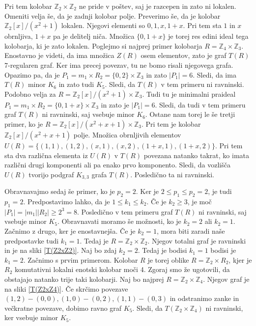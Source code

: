 \documentclass[a4paper, 12pt]{amsart}
\theoremstyle{definition} %
\theoremstyle{plain} %
\newcommand{\Z}{\mathbb Z}
\begin{document}
\begin{enumerate}
Pri tem kolobar $\Z_2 \times \Z_2$ ne pride v poštev, saj je razcepen in zato ni lokalen. Omeniti velja še, da je zadnji kolobar polje. Preverimo še, da je kolobar $\Z_2[x]/(x^2 + 1)$ lokalen. Njegovi elementi so $0,1,x,1+x$. Pri tem sta $1$ in $x$ obrnljiva, $1+x$ pa je delitelj niča. Množica $\{0,1+x\}$ je torej res edini ideal tega kolobarja, ki je zato lokalen. Poglejmo si najprej primer kolobarja $R=\Z_4 \times \Z_3$. Enostavno je videti, da ima množica $Z(R)$  osem elementov, zato je graf $T(R)$ 7-regularen graf. Ker ima precej povezav, tu ne bomo risali njegovega grafa. Opazimo pa, da je $P_1 = m_1 \times R_2 = 	\{0,2\} \times \Z_3$ in zato $|P_1| = 6$. Sledi, da ima $T(R)$ minor $K_6$ in zato tudi $K_5$. Sledi, da $T(R)$ v tem primeru ni ravninski. Podobno velja za $R = \Z_2[x]/(x^2 +1) \times \Z_3$. Tudi tu je minimalni praideal $P_1 = m_1 \times R_2 = \{0,1+x\} \times \Z_3$ in zato je $|P_1| = 6$. Sledi, da tudi v tem primeru graf $T(R)$ ni ravninski, saj vsebuje minor $K_6$. Ostane nam torej le še tretji primer, ko je $R = \Z_2[x]/(x^2 + x + 1) \times \Z_3$. Pri tem je kolobar $\Z_2[x]/(x^2 + x+1)$ polje. Množica obrnljivih elementov $U(R) = \{(1,1),(1,2),(x,1),(x,2),(1+x,1),(1+x,2)\}$. Pri tem sta dva različna elementa iz $U(R)$ v $T(R)$ povezana natanko takrat, ko imata različni drugi komponenti ali pa enako prvo komponento. Sledi, da vozlišča $U(R)$ tvorijo podgraf $K_{3,3}$ grafa $T(R)$. Posledično ta ni ravninski.

Obravnavajmo sedaj še primer, ko  je $p_2 = 2$. Ker je $2 \le p_1 \le p_2 = 2$, je tudi $p_1=2$. Predpostavimo lahko, da je $1 \le k_1 \le k_2$. Če je $k_2 \ge 3$, je moč $|P_1|=|m_1||R_2| \ge 2^3 = 8$. Posledično v tem primeru graf $T(R)$ ni ravninski, saj vsebuje minor $K_5$. Obravnavati moramo še možnosti, ko je $k_2 =2$ ali $k_2 = 1$. Začnimo z drugo, ker je enostavnejša. Če je $k_2=1$, mora biti zaradi naše predpostavke tudi $k_1=1$. Tedaj je $R=\Z_2 \times \Z_2$. Njegov totalni graf je ravninski in je na sliki \ref{T(Z2xZ2)}. 
Naj bo zdaj $k_2 = 2$. Tedaj je bodisi $k_1=1$ bodisi je $k_1 = 2$. Začnimo s prvim primerom. Kolobar $R$ je torej oblike $R=\Z_2 \times R_2$, kjer je $R_2$ komutativni lokalni enotski kolobar moči 4. Zgoraj smo že ugotovili, da obstajajo natanko trije taki kolobarji. Naj bo najprej $R=\Z_2 \times \Z_4$. Njegov graf je na sliki \ref{T(Z2xZ4)}. Če skrčimo povezave $(1,2)-(0,0), (1,0)-(0,2), (1,1)-(0,3)$ in  odstranimo zanke in večkratne povezave, dobimo ravno graf $K_5$. Sledi, da $T(\Z_2 \times \Z_4)$ ni ravninski, ker vsebuje minor $K_5$. 


\end{enumerate}
\end{document}
